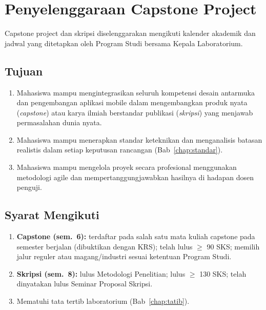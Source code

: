 \documentclass[12pt,a4paper]{report}
\begin{document}
\chapter{Penyelenggaraan Capstone Project}

Capstone project dan skripsi diselenggarakan mengikuti kalender akademik dan jadwal yang ditetapkan oleh Program Studi bersama Kepala Laboratorium.

\section{Tujuan}
\begin{enumerate}
\item Mahasiswa mampu mengintegrasikan seluruh kompetensi desain antarmuka dan pengembangan aplikasi mobile dalam mengembangkan produk nyata (\emph{capstone}) atau karya ilmiah berstandar publikasi (\emph{skripsi}) yang menjawab permasalahan dunia nyata.
\item Mahasiswa mampu menerapkan standar keteknikan dan menganalisis batasan realistis dalam setiap keputusan rancangan (Bab~\ref{chap:standar}).
\item Mahasiswa mampu mengelola proyek secara profesional menggunakan metodologi agile dan mempertanggungjawabkan hasilnya di hadapan dosen penguji.
\end{enumerate}

\section{Syarat Mengikuti}
\begin{enumerate}
\item \textbf{Capstone (sem.~6):} terdaftar pada salah satu mata kuliah capstone pada semester berjalan (dibuktikan dengan KRS); telah lulus $\geq$ 90 SKS; memilih jalur reguler atau magang/industri sesuai ketentuan Program Studi.
\item \textbf{Skripsi (sem.~8):} lulus Metodologi Penelitian; lulus $\geq$ 130 SKS; telah dinyatakan lulus Seminar Proposal Skripsi.
\item Mematuhi tata tertib laboratorium (Bab~\ref{chap:tatib}).
\end{enumerate}
\end{document}
